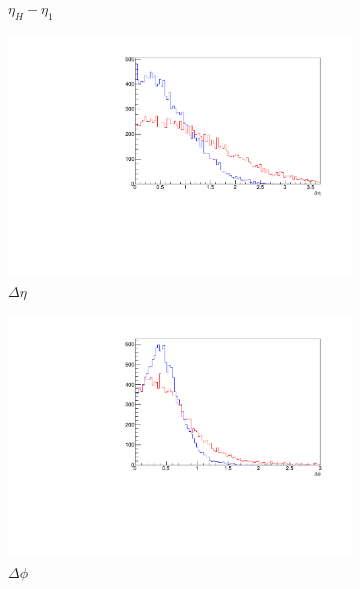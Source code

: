 \begin{figure}[htbp]
\begin{subfigure}[b]{0.25\textwidth}
	                \caption{$\eta_H - \eta_1$}
	                \label{fig:angle}
	\end{subfigure}
	\begin{subfigure}[b]{0.25\textwidth}
	                \includegraphics[width=\textwidth]{img/deta}
	                \caption{$\Delta\eta$}
	                \label{fig:deta}
	\end{subfigure}
	\begin{subfigure}[b]{0.25\textwidth}
	                \includegraphics[width=\textwidth]{img/dphi}
	                \caption{$\Delta\phi$}
	                \label{fig:dphi}
	\end{subfigure}	
	\begin{subfigure}[b]{0.25\textwidth}

\end{subfigure}
\end{figure}
